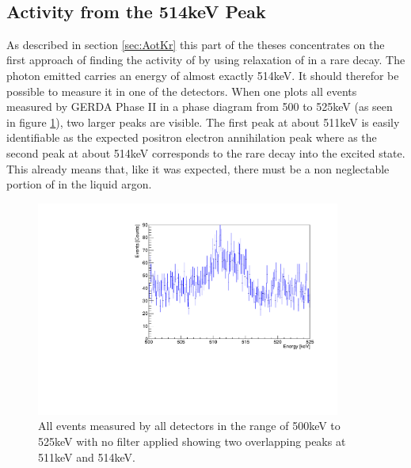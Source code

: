 \\

 
\subsection{Activity from the 514keV Peak}
\label{sec:SAfrom514}

As described in section \ref{sec:AotKr} this part of the theses concentrates on the first approach of finding the activity of  by using relaxation of  in a rare decay. 
The photon emitted carries an energy of almost exactly 514keV. 
It should therefor be possible to measure it in one of the detectors. 
When one plots all events measured by GERDA Phase II in a phase diagram from 500 to 525keV (as seen in figure \ref{fig:ungefiltertes500525}), two larger peaks are visible. 
The first peak at about 511keV is easily identifiable as the expected positron electron annihilation peak where as the second peak at about 514keV corresponds to the rare  decay into the excited  state. 
This already means that, like it was expected, there must be a non neglectable portion of  in the liquid argon.
\\

\begin{figure}[t!]
	\centering
	\ifmakefigures%
	\includegraphics[width=100mm]{./Bilder/GraphNoFiltersAtAllAll.pdf}
	\fi%
	\caption{\label{fig:ungefiltertes500525}
		All events measured by all detectors in the range of 500keV to 525keV with no filter applied showing two overlapping peaks at 511keV and 514keV.
	}
\end{figure}




